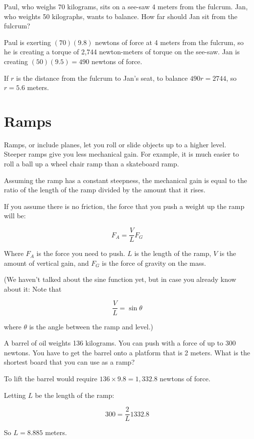 \begin{Exercise}[title={Lever}, label=lever]
  
Paul, who weighs 70 kilograms, sits on a see-saw 4 meters from the
fulcrum.  Jan, who weights 50 kilographs, wants to balance. How far
should Jan sit from the fulcrum?

\end{Exercise}
\begin{Answer}[ref=lever]
  Paul is exerting $(70)(9.8)$ newtons of force at 4 meters from the
  fulcrum, so he is creating a torque of 2,744 newton-meters of torque
  on the see-saw.  Jan is creating $(50)(9.5) = 490$ newtons of
  force.

  If $r$ is the distance from the fulcrum to Jan's seat, to balance
  $490 r = 2744$, so $r = 5.6$ meters.
\end{Answer}

\section{Ramps}

Ramps, or include planes, let you roll or slide objects up to a higher
level. Steeper ramps give you less mechanical gain. For example, it is much easier 
to roll a ball up a wheel chair ramp than a skateboard ramp.

Assuming the ramp has a constant steepness, the mechanical gain is
equal to the ratio of the length of the ramp divided by the amount
that it rises.

If you assume there is no friction, the force that you push a weight up the ramp will be:

$$F_A = \frac{V}{L} F_G$$

Where $F_A$ is the force you need to push. $L$ is the length of the
ramp, $V$ is the amount of vertical gain, and $F_G$ is the force of
gravity on the mass.

(We haven't talked about the sine function yet, but in case you already know about it: Note that

$$\frac{V}{L} = \sin{\theta}$$

where $\theta$ is the angle between the ramp and level.)

\begin{Exercise}[title={Ramp}, label=ramp]
A barrel of oil weights 136 kilograms. You can push with a force of
up to 300 newtons. You have to get the barrel onto a platform that is 2
meters.  What is the shortest board that you can use as a ramp?
\end{Exercise}
\begin{Answer}[ref=ramp]
  To lift the barrel would require $136 \times 9.8 = 1,332.8$ newtons of force.

  Letting $L$ be the length of the ramp:

  $$300= \frac{2}{L} 1332.8$$

  So $L = 8.885$ meters.
\end{Answer}

